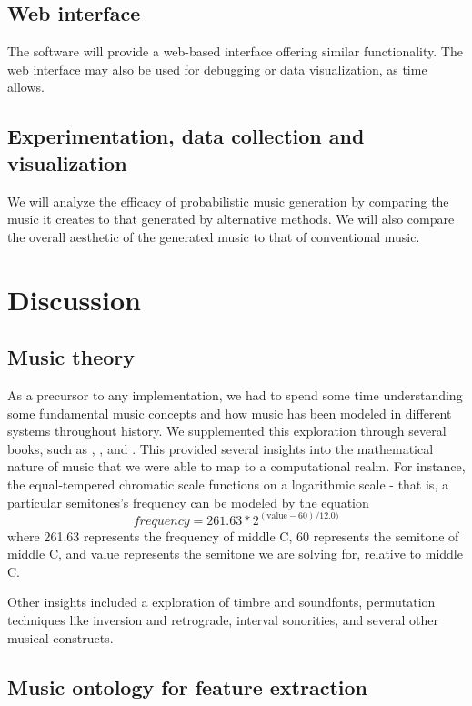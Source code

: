 \documentclass[11pt,conference,letterpaper]{IEEEtran}
\begin{document}
\subsection{Web interface}

The software will provide a web-based interface offering similar functionality. The web interface may also be used for debugging or data visualization, as time allows.

\subsection{Experimentation, data collection and visualization}

We will analyze the efficacy of probabilistic music generation by comparing the music it creates to that generated by alternative methods.  We will also compare the overall aesthetic of the generated music to that of conventional music.

\section{Discussion}

\subsection {Music theory}
As a precursor to any implementation, we had to spend some time understanding some fundamental music concepts and how music has been modeled in different systems throughout history. We supplemented this exploration through several books, such as \cite{temperly2007mprob}, \cite{krogerGeeksNerds}, and \cite{loy2006musimathics}. This provided several insights into the mathematical nature of music that we were able to map to a computational realm. For instance, the equal-tempered chromatic scale functions on a logarithmic scale - that is, a particular semitones's frequency can be modeled by the equation
{\small
	\[frequency = 261.63 * 2^{(\text{value} - 60) / 12.0)}\]
}
where 261.63 represents the frequency of middle C, 60 represents the semitone of middle C, and value represents the semitone we are solving for, relative to middle C.

Other insights included a exploration of timbre and soundfonts, permutation techniques like inversion and retrograde, interval sonorities, and several other musical constructs.

\subsection{Music ontology for feature extraction}
\end{document}

